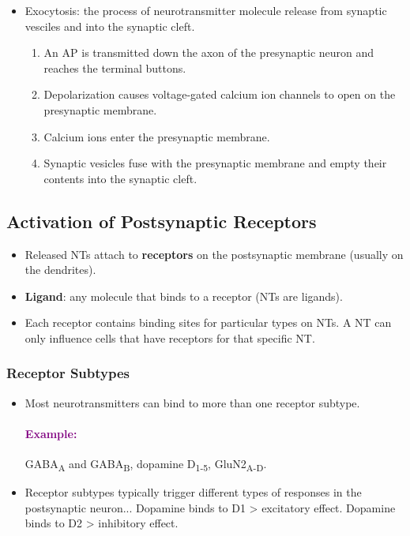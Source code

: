 \documentclass[12pt,a4paper]{article}
\newcommand{\example}[1]{\paragraph{\textcolor{purple}{Example:}} #1}
\begin{document}
	\begin{itemize}
		\item Exocytosis: the process of neurotransmitter molecule release from synaptic vesciles and into the synaptic cleft. 
		\begin{enumerate}
			\item An AP is transmitted down the axon of the presynaptic neuron and reaches the terminal buttons. 
			\item Depolarization causes voltage-gated calcium ion channels to open on the presynaptic membrane. 
			\item Calcium ions enter the presynaptic membrane. 
			\item Synaptic vesicles fuse with the presynaptic membrane and empty their contents into the synaptic cleft. 
		\end{enumerate}
	\end{itemize}
	
	\subsection{Activation of Postsynaptic Receptors}
	
	\begin{itemize}
		\item Released NTs attach to \textbf{receptors} on the postsynaptic membrane (usually on the dendrites).
		\item \textbf{Ligand}: any molecule that binds to a receptor (NTs are ligands).
		\item Each receptor contains binding sites for particular types on NTs. 
		\subitem A NT can only influence cells that have receptors for that specific NT.  
	\end{itemize}
	
	\subsubsection{Receptor Subtypes}
	
	\begin{itemize}
		\item Most neurotransmitters can bind to more than one receptor subtype. 
		\subitem \example{GABA\textsubscript{A} and GABA\textsubscript{B}, dopamine D\textsubscript{1-5}, GluN2\textsubscript{A-D}.
		}
		\item Receptor subtypes typically trigger different types of responses in the postsynaptic neuron...
		\subitem Dopamine binds to D1 > excitatory effect. 
		\subitem Dopamine binds to D2 > inhibitory effect. 
	\end{itemize}
	
\end{document}
